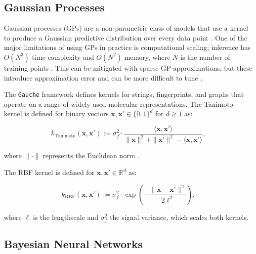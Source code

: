 \subsection{Gaussian Processes}

Gaussian processes (GPs) are a non-parametric class of models that use a kernel to produce a Gaussian predictive distribution over every data point \citep{Obrezanova2007, Rasmussen2005}. One of the major limitations of using GPs in practice is computational scaling; inference has $O(N^3)$ time complexity and $O(N^2)$ memory, where $N$ is the number of training points \citep{Rasmussen2005}. This can be mitigated with sparse GP approximations, but these introduce approximation error and can be more difficult to tune \citep{quinonero2005}.


The \texttt{Gauche} framework \citep{gauche} defines kernels for strings, fingerprints, and graphs that operate on a range of widely used molecular representations. The Tanimoto kernel \citep{Ralaivola2005, moss2020} is defined for binary vectors $\mathbf{x}, \mathbf{x}' \in \{0, 1\}^d$ for $d \geq 1$ as:

\begin{equation}
k_{\text{Tanimoto}}(\mathbf{x}, \mathbf{x}') := \sigma_f^2 \cdot \frac{\langle \mathbf{x}, \mathbf{x}' \rangle}{\|\mathbf{x}\|^2 + \|\mathbf{x}'\|^2 - \langle \mathbf{x}, \mathbf{x}' \rangle},
\label{eq:tanimoto_kernel}
\end{equation}

where $\|\cdot\|$ represents the Euclidean norm \citep{gauche}. 

The RBF kernel is defined for
$\mathbf{x}, \mathbf{x}' \in \mathbb{R}^d$ as:

\begin{equation}
k_{\text{RBF}}(\mathbf{x}, \mathbf{x}') := \sigma_f^2 \cdot \exp\left(-\frac{\|\mathbf{x} - \mathbf{x}'\|^2}{2\ell^2}\right),
\end{equation}

where $\ell$ is the lengthscale and $\sigma_f^2$ the signal variance, which scales both kernels.


\subsection{Bayesian Neural Networks}


